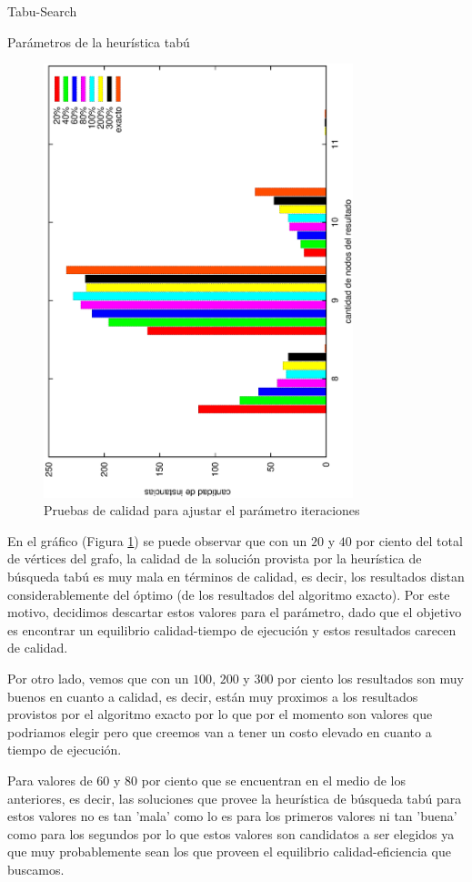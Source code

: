 \begin{section}{Tabu-Search}
\begin{subsection}{Parámetros de la heurística tabú}
	\begin{figure}[H]
		\centering
		  	\includegraphics[width=9cm,angle=-90]{tabu_search/iteraciones.eps}
		\caption{Pruebas de calidad para ajustar el parámetro iteraciones}
		\label{fig:Ajuste_del_parametro_iteraciones}
	\end{figure}

	En el gráfico (Figura \ref{fig:Ajuste_del_parametro_iteraciones}) se puede observar que con un $20$ y $40$ por ciento del total de vértices del grafo, la calidad de la solución provista por la heurística de búsqueda tabú es muy mala en términos de calidad, es decir, los resultados distan considerablemente del óptimo (de los resultados del algoritmo exacto). Por este motivo, decidimos descartar estos valores para el parámetro, dado que el objetivo es encontrar un equilibrio calidad-tiempo de ejecución y estos resultados carecen de calidad.

	Por otro lado, vemos que con un $100$, $200$ y $300$ por ciento los resultados son muy buenos en cuanto a calidad, es decir, están muy proximos a los resultados provistos por el algoritmo exacto por lo que por el momento son valores que podriamos elegir pero que creemos van a tener un costo elevado en cuanto a tiempo de ejecución.

	Para valores de $60$ y $80$ por ciento que se encuentran en el medio de los anteriores, es decir, las soluciones que provee la heurística de búsqueda tabú para estos valores no es tan 'mala' como lo es para los primeros valores ni tan 'buena' como para los segundos por lo que estos valores son candidatos a ser elegidos ya que muy probablemente sean los que proveen el equilibrio calidad-eficiencia que buscamos.\Pa


\end{subsection}
\end{section}

